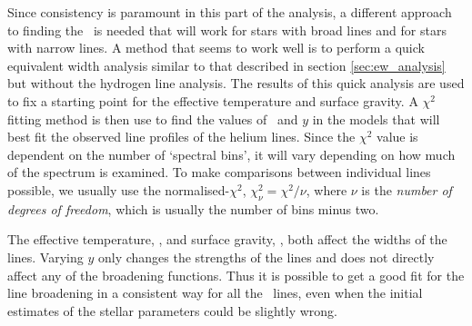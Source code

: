 Since consistency is paramount in this part of the analysis, a
different approach to finding the \vsini\ is needed that will work for
stars with broad lines and for stars with narrow lines. A method that
seems to work well is to perform a quick equivalent width analysis
similar to that described in section \ref{sec:ew_analysis} but without
the hydrogen line analysis. The results of this quick analysis are
used to fix a starting point for the effective temperature and surface
gravity. A $\chi^2$ fitting method is then use to find the values of
\vsini\ and $y$ in the models that will best fit the observed line
profiles of the helium lines. Since the $\chi^2$ value is dependent on
the number of `spectral bins', it will vary depending on how much of
the spectrum is examined. To make comparisons between individual lines
possible, we usually use the normalised-$\chi^2$, $\chi_\nu^2 =
\chi^2/\nu$, where $\nu$ is the \emph{number of degrees of freedom},
which is usually the number of bins minus two.

The effective temperature, \teff, and surface gravity, \logg, both
affect the widths of the lines. Varying $y$ only changes the strengths
of the lines and does not directly affect any of the broadening
functions. Thus it is possible to get a good fit for the
line broadening in a consistent way for all the \hei\ lines,
even when the initial estimates of the stellar parameters could be
slightly wrong.

